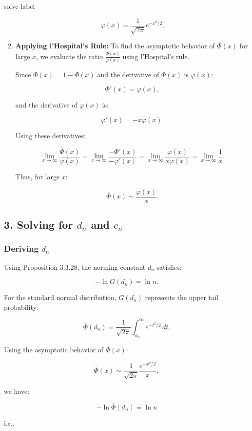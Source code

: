 \begin{solve}{}{solve-label}
\begin{enumerate}
	\[ 
	\varphi(x) = \frac{1}{\sqrt{2\pi}} e^{-x^2/2}. 
	\]
	
	\item \textbf{Applying l'Hospital's Rule:}
	To find the asymptotic behavior of $\overline{\Phi}(x)$ for large $x$, we evaluate the ratio \(\frac{\overline{\Phi}(x)}{\varphi(x)}\) using l'Hospital's rule.
	
	Since $\overline{\Phi}(x) = 1 - \Phi(x)$ and the derivative of $\Phi(x)$ is $\varphi(x)$:
	
	\[ 
	\Phi'(x) = \varphi(x),
	\]
	
	and the derivative of $\varphi(x)$ is:
	
	\[ 
	\varphi'(x) = -x \varphi(x). 
	\]
	
	Using these derivatives:
	
	\[ 
	\lim_{x \to \infty} \frac{\overline{\Phi}(x)}{\varphi(x)} = \lim_{x \to \infty} \frac{-\Phi'(x)}{-\varphi'(x)} = \lim_{x \to \infty} \frac{\varphi(x)}{x \varphi(x)} = \lim_{x \to \infty} \frac{1}{x}. 
	\]
	
	Thus, for large $x$:
	
	\[ 
	\overline{\Phi}(x) \sim \frac{\varphi(x)}{x}. 
	\]
	
\end{enumerate}

\subsection*{3. Solving for $d_n$ and $c_n$}

\subsubsection*{Deriving $d_n$}

Using Proposition 3.3.28, the norming constant $d_n$ satisfies:

\[ 
-\ln G(d_n) = \ln n. 
\]

For the standard normal distribution, $G(d_n)$ represents the upper tail probability:

\[ 
\overline{\Phi}(d_n) = \frac{1}{\sqrt{2\pi}} \int_{d_n}^{\infty} e^{-t^2/2} \, dt. 
\]

Using the asymptotic behavior of $\overline{\Phi}(x)$:

\[ 
\overline{\Phi}(x) \sim \frac{1}{\sqrt{2\pi}} \frac{e^{-x^2/2}}{x}, 
\]

we have:

\[ 
-\ln \overline{\Phi}(d_n) = \ln n 
\]

i.e.,


\end{solve}
